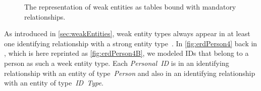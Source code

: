 %
%
\begin{figure}%
\centering%
%
%
%
\floatRowSep%
%
%
%
\caption{The representation of weak entities as tables bound with mandatory relationships.}%
\label{fig:logicalErdPerson4X}%
\end{figure}%
%
As introduced in \cref{sec:weakEntities}, weak entity types always appear in at least one identifying relationship with a strong entity type~\cite{S2024D:MEDTRDM}.
In \cref{fig:erdPerson4} back in , which is here reprinted as \cref{fig:erdPerson4B}, we modeled IDs that belong to a person as such a week entity type.
Each \emph{Personal~ID} is in an identifying relationship with an entity of type~\emph{Person} and also in an identifying relationship with an entity of type~\emph{ID~Type}.

